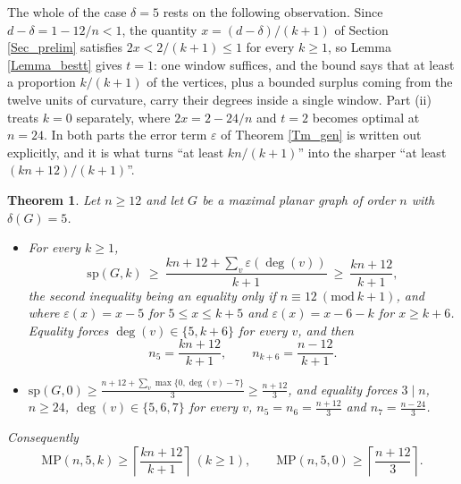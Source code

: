 \documentclass[12pt,a4paper]{article}%
\newtheorem{theorem}{Theorem}
\begin{document}
The whole of the case $\delta =5$ rests on the following observation. Since
$d-\delta =1-12/n<1$, the quantity $x=(d-\delta )/(k+1)$ of Section
\ref{Sec_prelim} satisfies $2x<2/(k+1)\leq 1$ for every $k\geq 1$, so Lemma
\ref{Lemma_bestt} gives $t=1$: one window suffices, and the bound says that at
least a proportion $k/(k+1)$ of the vertices, plus a bounded surplus coming from
the twelve units of curvature, carry their degrees inside a single window. Part
(ii) treats $k=0$ separately, where $2x=2-24/n$ and $t=2$ becomes optimal at
$n=24$. In both parts the error term $\varepsilon $ of Theorem \ref{Tm_gen} is
written out explicitly, and it is what turns ``at least $kn/(k+1)$'' into the
sharper ``at least $(kn+12)/(k+1)$''.



\begin{theorem}
\label{Tm_planar}Let $n\geq 12$ and let $G$ be a maximal planar graph of order $n$ with
$\delta (G)=5$.

\begin{itemize}
\item[\textrm{(i)}] For every $k\geq 1$,
\[
\mathrm{sp}(G,k)\ \geq \ \frac{kn+12+\sum_{v}\varepsilon (\deg (v))}{k+1}\ \geq \ \frac{kn+12}{k+1}%
,
\]
the second inequality being an equality only if $n\equiv 12\ (\mathrm{mod}\ k+1)$, and
where $\varepsilon (x)=x-5$ for $5\leq x\leq k+5$ and $\varepsilon (x)=x-6-k$ for $x\geq k+6$.
Equality forces $\deg (v)\in \{5,k+6\}$ for every $v$, and then
\[
n_{5}=\frac{kn+12}{k+1},\qquad n_{k+6}=\frac{n-12}{k+1}.
\]

\item[\textrm{(ii)}] $\displaystyle \mathrm{sp}(G,0)\geq \frac{n+12+\sum_{v}\max \{0,\deg (v)-7\}}%
{3}\geq \frac{n+12}{3}$, and equality forces $3\mid n$, $n\geq 24$, $\deg (v)\in \{5,6,7\}$ for
every $v$, $n_{5}=n_{6}=\frac{n+12}{3}$ and $n_{7}=\frac{n-24}{3}$.
\end{itemize}

Consequently
\[
\mathrm{MP}(n,5,k)\geq \left\lceil \frac{kn+12}{k+1}\right\rceil \ (k\geq 1),\qquad \mathrm{MP}%
(n,5,0)\geq \left\lceil \frac{n+12}{3}\right\rceil .
\]
\end{theorem}
\end{document}
